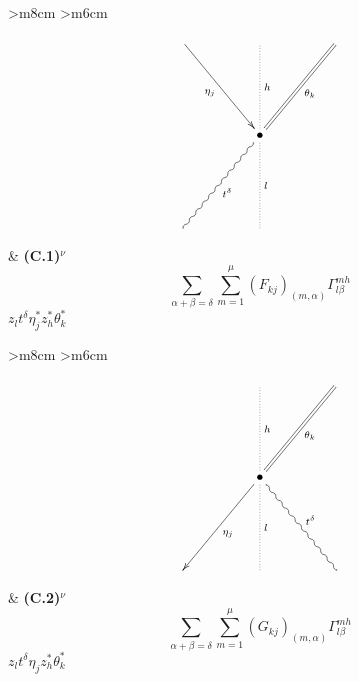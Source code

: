 \documentclass[english,letter paper,12pt,leqno]{article}
\theoremstyle{example}
\numberwithin{equation}{section}
\begin{document}
\begin{center}
\begin{tabular}{ >{\centering}m{8cm} >{\centering}m{6cm} }
\[
\xymatrix@C+2pc@R+3pc{
\ar[dr]_-{\eta_j} & \ar@{.}[d]^-{h} & \ar@{=}[dl]^-{\theta_k}\\
& \bullet \ar@{.}[d]^-{l} \ar@{~}[dl]^-{t^\delta}\\
& &
}
\]
&
\textbf{(C.1)${}^\nu$}
\vspace{1cm}
\[\sum_{\alpha + \beta = \delta } \sum_{m=1}^\mu (F_{kj})_{(m,\alpha)} \Gamma^{m h}_{l \beta}\]
\vspace{0.5cm}
$z_{l} t^\delta \eta_j^* z_h^* \theta_k^*$
\end{tabular}
\end{center}

\begin{center}
\begin{tabular}{ >{\centering}m{8cm} >{\centering}m{6cm} }
\[
\xymatrix@C+2pc@R+3pc{
& \ar@{.}[d]^-{h} & \ar@{=}[dl]^-{\theta_k} \\
& \bullet \ar[dl]^-{\eta_j}\ar@{.}[d]^-{l} \ar@{~}[dr]^-{t^\delta}\\
& &
}
\]
&
\textbf{(C.2)${}^\nu$}
\vspace{1cm}
\[\sum_{\alpha + \beta = \delta } \sum_{m=1}^\mu (G_{kj})_{(m,\alpha)} \Gamma^{m h}_{l \beta}\]
\vspace{0.5cm}
$z_{l} t^\delta \eta_j z_h^* \theta_k^*$
\end{tabular}
\end{center}
\end{document}
